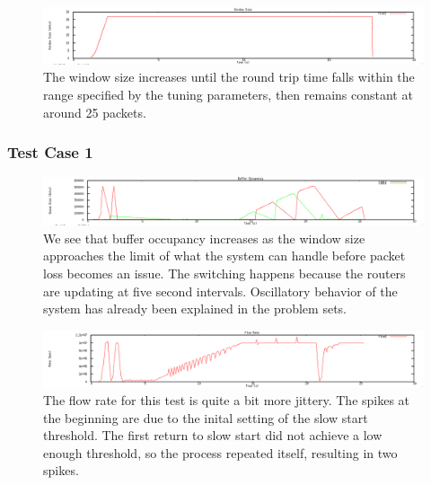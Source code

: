 \documentclass[12pt]{article}
\begin{document}
\begin{figure}[!ht]
\centering \includegraphics[bb= 0 0 1300 250, scale=.35]{figures/Test0_Vegas/window_size.png}
\caption{The window size increases until the round trip time falls within the range specified by the tuning parameters, then remains constant at around 25 packets.}
\label{fig:test0_vegas_window_size}
\end{figure}

\newpage

\subsubsection{Test Case 1}

\begin{figure}[!ht]
\centering \includegraphics[bb= 0 0 1300 250, scale=.35]{figures/Test1_Tahoe/buffer_occ.png}
\caption{We see that buffer occupancy increases as the window size approaches the limit of what the system can handle before packet loss becomes an issue. The switching happens because the routers are updating at five second intervals. Oscillatory behavior of the system has already been explained in the problem sets.}
\label{fig:test1_tahoe_buffer_occ}
\end{figure}

\begin{figure}[!ht]
\centering \includegraphics[bb= 0 0 1300 250, scale=.35]{figures/Test1_Tahoe/flow_rate.png}
\caption{The flow rate for this test is quite a bit more jittery. The spikes at the beginning are due to the inital setting of the slow start threshold. The first return to slow start did not achieve a low enough threshold, so the process repeated itself, resulting in two spikes.}
\label{fig:test1_tahoe_flow_rate}
\end{figure}
\end{document}
